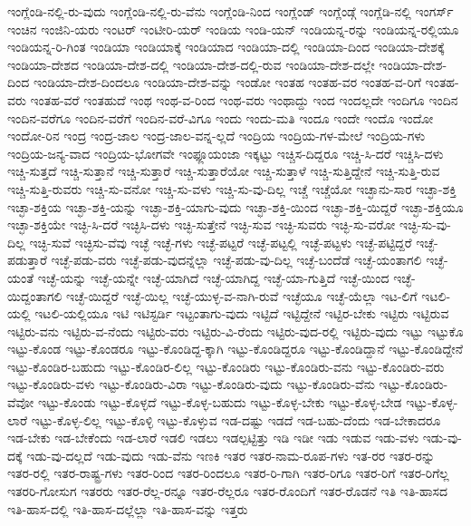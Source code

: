 {ಇಂಗ್ಲೆಂಡಿ-ನಲ್ಲಿ-ರು-ವುದು
ಇಂಗ್ಲೆಂಡಿ-ನಲ್ಲಿ-ರು-ವೆನು
ಇಂಗ್ಲೆಂಡಿ-ನಿಂದ
ಇಂಗ್ಲೆಂಡ್
ಇಂಗ್ಲೆಂಡ್ಗೆ
ಇಂಗ್ಲೆಡಿ-ನಲ್ಲಿ
ಇಂಗರ್ಸ್
ಇಂಚಿನ
ಇಂಜಿನಿ-ಯರು
ಇಂಟರ್
ಇಂಟೀರಿ-ಯರ್
ಇಂಡಿಯ
ಇಂಡಿ-ಯನ್
ಇಂಡಿಯನ್ನ-ರನ್ನು
ಇಂಡಿಯನ್ನ-ರಲ್ಲಿಯೂ
ಇಂಡಿಯನ್ನ-ರಿ-ಗಿಂತ
ಇಂಡಿಯಾ
ಇಂಡಿಯಾಕ್ಕೆ
ಇಂಡಿಯಾದ
ಇಂಡಿಯಾ-ದಲ್ಲಿ
ಇಂಡಿಯಾ-ದಿಂದ
ಇಂಡಿಯಾ-ದೇಶಕ್ಕೆ
ಇಂಡಿಯಾ-ದೇಶದ
ಇಂಡಿಯಾ-ದೇಶ-ದಲ್ಲಿ
ಇಂಡಿಯಾ-ದೇಶ-ದಲ್ಲಿ-ರುವ
ಇಂಡಿಯಾ-ದೇಶ-ದಲ್ಲೇ
ಇಂಡಿಯಾ-ದೇಶ-ದಿಂದ
ಇಂಡಿಯಾ-ದೇಶ-ದಿಂದಲೂ
ಇಂಡಿಯಾ-ದೇಶ-ವನ್ನು
ಇಂಡೋ
ಇಂತಹ
ಇಂತಹ-ವರ
ಇಂತಹ-ವ-ರಿಗೆ
ಇಂತಹ-ವರು
ಇಂತಹ-ವರೆ
ಇಂತಹುದೆ
ಇಂಥ
ಇಂಥ-ವ-ರಿಂದ
ಇಂಥ-ವರು
ಇಂಥಾದ್ದು
ಇಂದ
ಇಂದಲ್ಲದೇ
ಇಂದಿಗೂ
ಇಂದಿನ
ಇಂದಿನ-ವರೆಗೂ
ಇಂದಿನ-ವರೆಗೆ
ಇಂದಿನ-ವರೆ-ವಿಗೂ
ಇಂದು
ಇಂದು-ಮತಿ
ಇಂದೂ
ಇಂದೇ
ಇಂದೊ
ಇಂದೋ
ಇಂದೋ-ರಿನ
ಇಂದ್ರ
ಇಂದ್ರ-ಜಾಲ
ಇಂದ್ರ-ಜಾಲ-ವನ್ನ-ಲ್ಲದೆ
ಇಂದ್ರಿಯ
ಇಂದ್ರಿಯ-ಗಳ-ಮೇಲೆ
ಇಂದ್ರಿಯ-ಗಳು
ಇಂದ್ರಿಯ-ಜನ್ಯ-ವಾದ
ಇಂದ್ರಿಯ-ಭೋಗವೇ
ಇಂಫ್ಲೂಯಂಜಾ
ಇಕ್ಕಟ್ಟು
ಇಚ್ಚಿಸ-ದಿದ್ದರೂ
ಇಚ್ಚಿ-ಸಿ-ದರೆ
ಇಚ್ಚಿಸಿ-ದಳು
ಇಚ್ಚಿ-ಸುತ್ತದೆ
ಇಚ್ಚಿ-ಸುತ್ತಾನೆ
ಇಚ್ಚಿ-ಸುತ್ತಾರೆ
ಇಚ್ಚಿ-ಸುತ್ತಾರೆಯೋ
ಇಚ್ಚಿ-ಸುತ್ತಾಳೆ
ಇಚ್ಚಿ-ಸುತ್ತಿದ್ದೇನೆ
ಇಚ್ಚಿ-ಸುತ್ತಿ-ರುವ
ಇಚ್ಚಿ-ಸುತ್ತಿ-ರುವರು
ಇಚ್ಚಿ-ಸು-ವನೋ
ಇಚ್ಚಿ-ಸು-ವಳು
ಇಚ್ಚಿ-ಸು-ವು-ದಿಲ್ಲ
ಇಚ್ಚೆ
ಇಚ್ಚೆಯೋ
ಇಚ್ಛಾನು-ಸಾರ
ಇಚ್ಛಾ-ಶಕ್ತಿ
ಇಚ್ಛಾ-ಶಕ್ತಿಯ
ಇಚ್ಛಾ-ಶಕ್ತಿ-ಯನ್ನು
ಇಚ್ಛಾ-ಶಕ್ತಿ-ಯಾಗು-ವುದು
ಇಚ್ಛಾ-ಶಕ್ತಿ-ಯಿಂದ
ಇಚ್ಛಾ-ಶಕ್ತಿ-ಯಿದ್ದರೆ
ಇಚ್ಛಾ-ಶಕ್ತಿಯೂ
ಇಚ್ಛಾ-ಶಕ್ತಿಯೇ
ಇಚ್ಛಿ-ಸಿ-ದರೆ
ಇಚ್ಛಿಸಿ-ದಳು
ಇಚ್ಛಿ-ಸುತ್ತೇನೆ
ಇಚ್ಛಿ-ಸುವ
ಇಚ್ಛಿ-ಸುವರು
ಇಚ್ಛಿ-ಸು-ವರೋ
ಇಚ್ಛಿ-ಸು-ವು-ದಿಲ್ಲ
ಇಚ್ಛಿ-ಸುವೆ
ಇಚ್ಛಿಸು-ವೆವು
ಇಚ್ಛೆ
ಇಚ್ಛೆ-ಗಳು
ಇಚ್ಛೆ-ಪಟ್ಟರೆ
ಇಚ್ಛೆ-ಪಟ್ಟಲ್ಲಿ
ಇಚ್ಛೆ-ಪಟ್ಟಳು
ಇಚ್ಛೆ-ಪಟ್ಟಿದ್ದರೆ
ಇಚ್ಛೆ-ಪಡುತ್ತಾರೆ
ಇಚ್ಛೆ-ಪಡು-ವರು
ಇಚ್ಛೆ-ಪಡು-ವುದನ್ನೆಲ್ಲಾ
ಇಚ್ಛೆ-ಪಡು-ವು-ದಿಲ್ಲ
ಇಚ್ಛೆ-ಬಂದೆಡೆ
ಇಚ್ಛೆ-ಯಂತಾಗಲಿ
ಇಚ್ಛೆ-ಯಂತೆ
ಇಚ್ಛೆ-ಯನ್ನು
ಇಚ್ಛೆ-ಯನ್ನೇ
ಇಚ್ಛೆ-ಯಾಗಿದೆ
ಇಚ್ಛೆ-ಯಾಗಿದ್ದ
ಇಚ್ಛೆ-ಯಾ-ಗುತ್ತಿದೆ
ಇಚ್ಛೆ-ಯಿಂದ
ಇಚ್ಛೆ-ಯಿದ್ದಂತಾಗಲಿ
ಇಚ್ಛೆ-ಯಿದ್ದರೆ
ಇಚ್ಛೆ-ಯಿಲ್ಲ
ಇಚ್ಛೆ-ಯುಳ್ಳ-ವ-ನಾಗಿ-ರುವೆ
ಇಚ್ಛೆಯೂ
ಇಚ್ಛೆ-ಯೆಲ್ಲಾ
ಇಟ-ಲಿಗೆ
ಇಟಲಿ-ಯಲ್ಲಿ
ಇಟಲಿ-ಯಲ್ಲಿಯೂ
ಇಟಿ
ಇಟಿಸ್ಟರ್ಡಿ
ಇಟ್ಟಂತಾಗು-ವುದು
ಇಟ್ಟಿದೆ
ಇಟ್ಟಿದ್ದೇನೆ
ಇಟ್ಟಿರ-ಬೇಕು
ಇಟ್ಟಿರು
ಇಟ್ಟಿರುವ
ಇಟ್ಟಿರು-ವನು
ಇಟ್ಟಿರು-ವ-ನೆಂದು
ಇಟ್ಟಿರು-ವರು
ಇಟ್ಟಿರು-ವಿ-ರೆಂದು
ಇಟ್ಟಿರು-ವುದ-ರಲ್ಲಿ
ಇಟ್ಟಿರು-ವುದು
ಇಟ್ಟು
ಇಟ್ಟುಕೊ
ಇಟ್ಟು-ಕೊಂಡ
ಇಟ್ಟು-ಕೊಂಡರೂ
ಇಟ್ಟು-ಕೊಂಡಿದ್ದ-ಕ್ಕಾಗಿ
ಇಟ್ಟು-ಕೊಂಡಿದ್ದರೂ
ಇಟ್ಟು-ಕೊಂಡಿದ್ದಾನೆ
ಇಟ್ಟು-ಕೊಂಡಿದ್ದೇನೆ
ಇಟ್ಟು-ಕೊಂಡಿರ-ಬಹುದು
ಇಟ್ಟು-ಕೊಂಡಿರ-ಲಿಲ್ಲ
ಇಟ್ಟು-ಕೊಂಡಿರು
ಇಟ್ಟು-ಕೊಂಡಿರು-ವನು
ಇಟ್ಟು-ಕೊಂಡಿರು-ವರು
ಇಟ್ಟು-ಕೊಂಡಿರು-ವಳು
ಇಟ್ಟು-ಕೊಂಡಿರು-ವಿರಾ
ಇಟ್ಟು-ಕೊಂಡಿರು-ವುದು
ಇಟ್ಟು-ಕೊಂಡಿರು-ವೆನು
ಇಟ್ಟು-ಕೊಂಡಿರು-ವೆವೋ
ಇಟ್ಟು-ಕೊಂಡು
ಇಟ್ಟು-ಕೊಳ್ಳದೆ
ಇಟ್ಟು-ಕೊಳ್ಳ-ಬಹುದು
ಇಟ್ಟು-ಕೊಳ್ಳ-ಬೇಕು
ಇಟ್ಟು-ಕೊಳ್ಳ-ಬೇಡ
ಇಟ್ಟು-ಕೊಳ್ಳ-ಲಾರೆ
ಇಟ್ಟು-ಕೊಳ್ಳ-ಲಿಲ್ಲ
ಇಟ್ಟು-ಕೊಳ್ಳಿ
ಇಟ್ಟು-ಕೊಳ್ಳುವ
ಇಡ-ದಷ್ಟು
ಇಡದೆ
ಇಡ-ಬಹು-ದೆಂದು
ಇಡ-ಬೇಕಾದರೂ
ಇಡ-ಬೇಕು
ಇಡ-ಬೇಕೆಂದು
ಇಡ-ಲಾರೆ
ಇಡಲಿ
ಇಡಲು
ಇಡಲ್ಪಟ್ಟಿತ್ತು
ಇಡಿ
ಇಡೀ
ಇಡು
ಇಡುವ
ಇಡು-ವಳು
ಇಡು-ವು-ದಕ್ಕೆ
ಇಡು-ವು-ದಲ್ಲದೆ
ಇಡು-ವುದು
ಇಡು-ವೆನು
ಇಣಕಿ
ಇತರ
ಇತರ-ನಾಮ-ರೂಪ-ಗಳು
ಇತ-ರರ
ಇತರ-ರನ್ನು
ಇತರ-ರಲ್ಲಿ
ಇತರ-ರಾಷ್ಟ್ರ-ಗಳು
ಇತರ-ರಿಂದ
ಇತರ-ರಿಂದಲೂ
ಇತರ-ರಿ-ಗಾಗಿ
ಇತರ-ರಿಗೂ
ಇತರ-ರಿಗೆ
ಇತರ-ರಿಗೆಲ್ಲ
ಇತರರಿ-ಗೋಸುಗ
ಇತರರು
ಇತರ-ರೆಲ್ಲ-ರನ್ನೂ
ಇತರ-ರೆಲ್ಲರೂ
ಇತರ-ರೊಂದಿಗೆ
ಇತರ-ರೊಡನೆ
ಇತಿ
ಇತಿ-ಹಾಸದ
ಇತಿ-ಹಾಸ-ದಲ್ಲಿ
ಇತಿ-ಹಾಸ-ದಲ್ಲೆಲ್ಲಾ
ಇತಿ-ಹಾಸ-ವನ್ನು
ಇತ್ತರು
}
